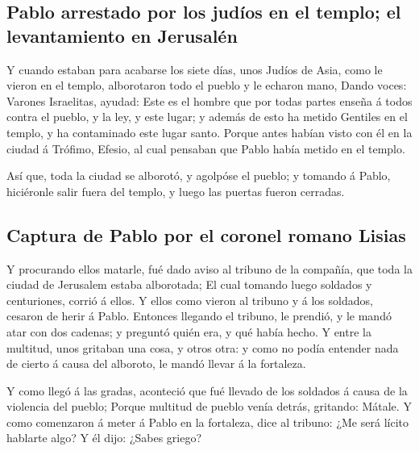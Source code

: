 \hypertarget{pablo-arrestado-por-los-juduxedos-en-el-templo-el-levantamiento-en-jerusaluxe9n}{%
\subsection{Pablo arrestado por los judíos en el templo; el
levantamiento en
Jerusalén}\label{pablo-arrestado-por-los-juduxedos-en-el-templo-el-levantamiento-en-jerusaluxe9n}}

 Y cuando estaban para acabarse los siete días, unos
Judíos de Asia, como le vieron en el templo, alborotaron todo el pueblo
y le echaron mano,  Dando voces: Varones Israelitas,
ayudad: Este es el hombre que por todas partes enseña á todos contra el
pueblo, y la ley, y este lugar; y además de esto ha metido Gentiles en
el templo, y ha contaminado este lugar santo.  Porque
antes habían visto con él en la ciudad á Trófimo, Efesio, al cual
pensaban que Pablo había metido en el templo.

 Así que, toda la ciudad se alborotó, y agolpóse el
pueblo; y tomando á Pablo, hiciéronle salir fuera del templo, y luego
las puertas fueron cerradas.

\hypertarget{captura-de-pablo-por-el-coronel-romano-lisias}{%
\subsection{Captura de Pablo por el coronel romano
Lisias}\label{captura-de-pablo-por-el-coronel-romano-lisias}}

 Y procurando ellos matarle, fué dado aviso al tribuno de
la compañía, que toda la ciudad de Jerusalem estaba alborotada;
 El cual tomando luego soldados y centuriones, corrió á
ellos. Y ellos como vieron al tribuno y á los soldados, cesaron de herir
á Pablo.  Entonces llegando el tribuno, le prendió, y le
mandó atar con dos cadenas; y preguntó quién era, y qué había hecho.
 Y entre la multitud, unos gritaban una cosa, y otros
otra: y como no podía entender nada de cierto á causa del alboroto, le
mandó llevar á la fortaleza.

 Y como llegó á las gradas, aconteció que fué llevado de
los soldados á causa de la violencia del pueblo;  Porque
multitud de pueblo venía detrás, gritando: Mátale.  Y
como comenzaron á meter á Pablo en la fortaleza, dice al tribuno: ¿Me
será lícito hablarte algo? Y él dijo: ¿Sabes griego?

